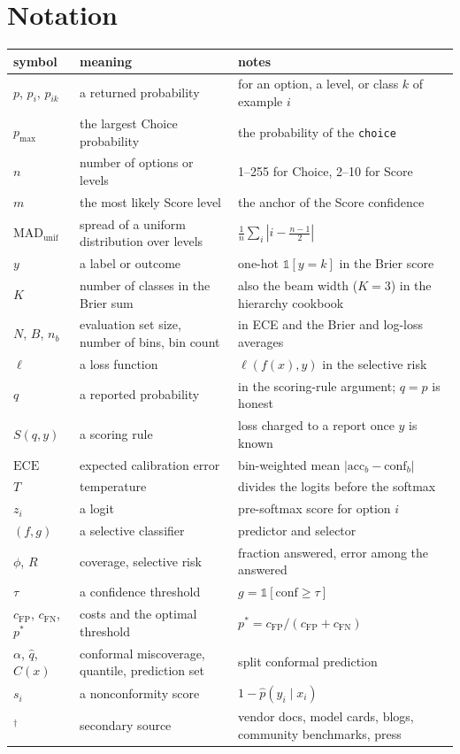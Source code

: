 \documentclass[11pt,letterpaper]{article}
\newcommand{\pmax}{p_{\max}}
\newcommand{\ECE}{\mathrm{ECE}}
\begin{document}
\section{Notation}

\begin{center}\footnotesize\setlength{\tabcolsep}{4pt}
\begin{tabular}{@{}lp{4.3cm}p{6.7cm}@{}}
\toprule
symbol & meaning & notes\\
\midrule
$p$, $p_i$, $p_{ik}$ & a returned probability & for an option, a level, or class $k$ of example $i$\\
$\pmax$ & the largest Choice probability & the probability of the \texttt{choice}\\
$n$ & number of options or levels & 1--255 for Choice, 2--10 for Score\\
$m$ & the most likely Score level & the anchor of the Score confidence\\
$\mathrm{MAD}_{\mathrm{unif}}$ & spread of a uniform distribution over levels & $\frac1n\sum_i|i-\frac{n-1}{2}|$\\
$y$ & a label or outcome & one-hot $\mathbb 1[y=k]$ in the Brier score\\
$K$ & number of classes in the Brier sum & also the beam width ($K=3$) in the hierarchy cookbook\\
$N$, $B$, $n_b$ & evaluation set size, number of bins, bin count & in ECE and the Brier and log-loss averages\\
$\ell$ & a loss function & $\ell(f(x),y)$ in the selective risk\\
$q$ & a reported probability & in the scoring-rule argument; $q=p$ is honest\\
$S(q,y)$ & a scoring rule & loss charged to a report once $y$ is known\\
$\ECE$ & expected calibration error & bin-weighted mean $|\mathrm{acc}_b-\mathrm{conf}_b|$\\
$T$ & temperature & divides the logits before the softmax\\
$z_i$ & a logit & pre-softmax score for option $i$\\
$(f,g)$ & a selective classifier & predictor and selector\\
$\phi$, $R$ & coverage, selective risk & fraction answered, error among the answered\\
$\tau$ & a confidence threshold & $g=\mathbb 1[\mathrm{conf}\geq\tau]$\\
$c_{\mathrm{FP}}$, $c_{\mathrm{FN}}$, $p^{*}$ & costs and the optimal threshold & $p^{*}=c_{\mathrm{FP}}/(c_{\mathrm{FP}}+c_{\mathrm{FN}})$\\
$\alpha$, $\hat q$, $C(x)$ & conformal miscoverage, quantile, prediction set & split conformal prediction\\
$s_i$ & a nonconformity score & $1-\hat p(y_i\mid x_i)$\\
$^\dagger$ & secondary source & vendor docs, model cards, blogs, community benchmarks, press\\
\bottomrule
\end{tabular}
\end{center}
\end{document}

